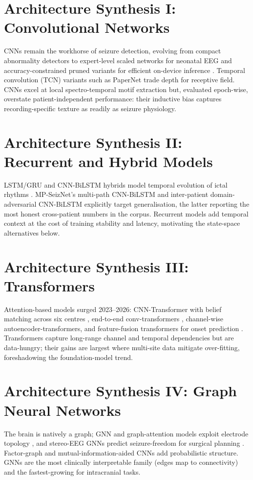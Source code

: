 \documentclass[10pt,journal,twocolumn]{IEEEtran}
\begin{document}
\section{Architecture Synthesis I: Convolutional Networks}
CNNs remain the workhorse of seizure detection, evolving from compact abnormality detectors \citep{ep210510358} to expert-level scaled networks for neonatal EEG \citep{ep240509911} and accuracy-constrained pruned variants for efficient on-device inference \citep{ep250905190}. Temporal convolution (TCN) variants such as PaperNet trade depth for receptive field. CNNs excel at local spectro-temporal motif extraction but, evaluated epoch-wise, overstate patient-independent performance: their inductive bias captures recording-specific texture as readily as seizure physiology.

\section{Architecture Synthesis II: Recurrent and Hybrid Models}
LSTM/GRU and CNN-BiLSTM hybrids model temporal evolution of ictal rhythms \citep{ep221104628}. MP-SeizNet's multi-path CNN-BiLSTM and inter-patient domain-adversarial CNN-BiLSTM \citep{ep250515203} explicitly target generalisation, the latter reporting the most honest cross-patient numbers in the corpus. Recurrent models add temporal context at the cost of training stability and latency, motivating the state-space alternatives below.

\section{Architecture Synthesis III: Transformers}
Attention-based models surged 2023--2026: CNN-Transformer with belief matching across six centres \citep{ep220800025}, end-to-end conv-transformers \citep{ep230510502}, channel-wise autoencoder-transformers, and feature-fusion transformers for onset prediction \citep{ep260602166}. Transformers capture long-range channel and temporal dependencies but are data-hungry; their gains are largest where multi-site data mitigate over-fitting, foreshadowing the foundation-model trend.

\section{Architecture Synthesis IV: Graph Neural Networks}
The brain is natively a graph; GNN and graph-attention models exploit electrode topology \citep{ep220807448,ep250715118}, and stereo-EEG GNNs predict seizure-freedom for surgical planning \citep{ep250215198}. Factor-graph and mutual-information-aided CNNs add probabilistic structure. GNNs are the most clinically interpretable family (edges map to connectivity) and the fastest-growing for intracranial tasks.
\end{document}
